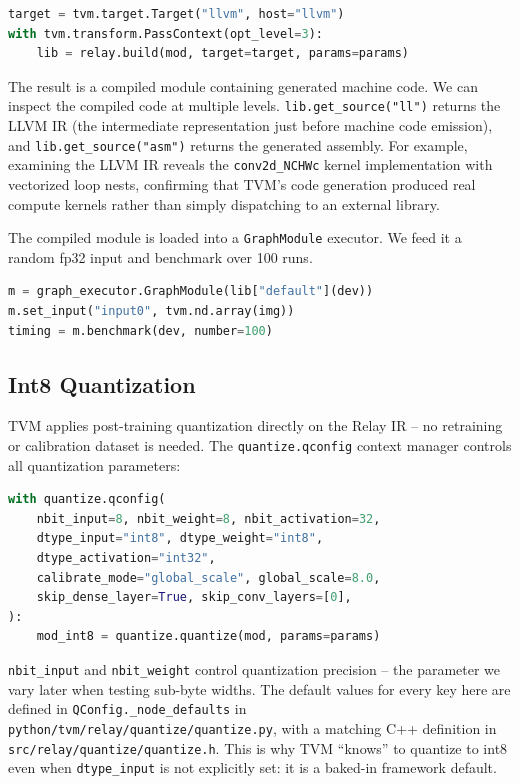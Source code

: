 \documentclass[11pt,a4paper]{article}
\begin{document}
\begin{lstlisting}[language=Python]
target = tvm.target.Target("llvm", host="llvm")
with tvm.transform.PassContext(opt_level=3):
    lib = relay.build(mod, target=target, params=params)
\end{lstlisting}

The result is a compiled module containing generated machine code. We can inspect the compiled code at multiple levels. \texttt{lib.get\_source("ll")} returns the LLVM IR (the intermediate representation just before machine code emission), and \texttt{lib.get\_source("asm")} returns the generated assembly. For example, examining the LLVM IR reveals the \texttt{conv2d\_NCHWc} kernel implementation with vectorized loop nests, confirming that TVM's code generation produced real compute kernels rather than simply dispatching to an external library.

The compiled module is loaded into a \texttt{GraphModule} executor. We feed it a random fp32 input and benchmark over 100 runs.

\begin{lstlisting}[language=Python]
m = graph_executor.GraphModule(lib["default"](dev))
m.set_input("input0", tvm.nd.array(img))
timing = m.benchmark(dev, number=100)
\end{lstlisting}

\subsection{Int8 Quantization}

TVM applies post-training quantization directly on the Relay IR -- no retraining or calibration dataset is needed. The \texttt{quantize.qconfig} context manager controls all quantization parameters:

\begin{lstlisting}[language=Python]
with quantize.qconfig(
    nbit_input=8, nbit_weight=8, nbit_activation=32,
    dtype_input="int8", dtype_weight="int8",
    dtype_activation="int32",
    calibrate_mode="global_scale", global_scale=8.0,
    skip_dense_layer=True, skip_conv_layers=[0],
):
    mod_int8 = quantize.quantize(mod, params=params)
\end{lstlisting}

\texttt{nbit\_input} and \texttt{nbit\_weight} control quantization precision -- the parameter we vary later when testing sub-byte widths. The default values for every key here are defined in \texttt{QConfig.\_node\_defaults} in \texttt{python/tvm/relay/quantize/\allowbreak quantize.py}, with a matching C++ definition in \texttt{src/relay/quantize/quantize.h}. This is why TVM ``knows'' to quantize to int8 even when \texttt{dtype\_input} is not explicitly set: it is a baked-in framework default.
\end{document}
